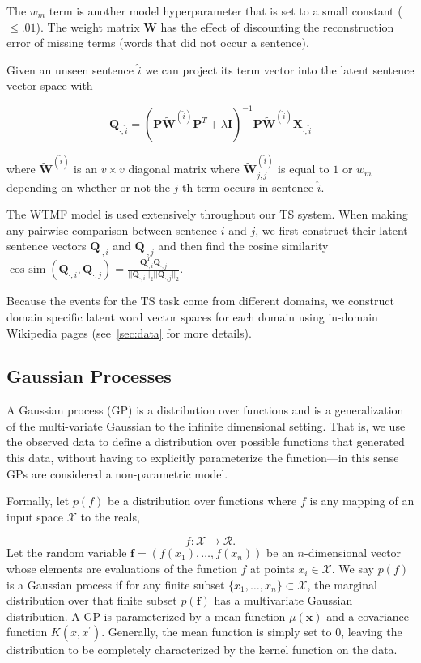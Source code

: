 The $w_m$ term is another model hyperparameter that is set to a small constant
($\le .01$). The weight matrix $\mathbf{W}$ has the effect of discounting the
reconstruction error of missing terms (words that did not occur a sentence).

Given an unseen sentence $\hat{i}$ we can project its term vector into the
latent sentence vector space with 

$$
\mathbf{Q}_{\cdot,\hat{i}} = (\mathbf{P}\mathbf{\tilde{W}}^{(\hat{i})}
\mathbf{P}^T  + \lambda\mathbf{I} )^{-1} 
\mathbf{P}\mathbf{\tilde{W}}^{(\hat{i})} \mathbf{X}_{\cdot, \hat{i}}
$$  

where $\mathbf{\tilde{W}}^{(\hat{i})}$ is an $v\times v$ diagonal matrix
where $\mathbf{\tilde{W}}^{(\hat{i})}_{j,j}$ is equal to $1$ or $w_m$ 
depending on whether or not the $j$-th term occurs in sentence $\hat{i}$.


The WTMF model is used extensively throughout our TS system. When making any 
pairwise comparison between sentence $i$ and $j$, we first construct
their latent sentence vectors $\mathbf{Q}_{\cdot,i}$ and
$\mathbf{Q}_{\cdot,j}$ and then find the cosine similarity 
$\displaystyle \operatorname{cos-sim}
(\mathbf{Q}_{\cdot,i}, \mathbf{Q}_{\cdot,j}) = 
\frac{\mathbf{Q}_{\cdot,i}^T\mathbf{Q}_{\cdot,j}}{||\mathbf{Q}_{\cdot,i}||_2
||\mathbf{Q}_{\cdot,j}||_2   }$.


Because the events for the TS task come from different domains, we construct
domain specific latent word vector spaces for each domain using in-domain 
Wikipedia pages (see~\cref{sec:data} for more details).

\subsection{Gaussian Processes}

A Gaussian process (GP) is a distribution over functions and is a 
generalization of the multi-variate Gaussian to the infinite dimensional
setting. That is, we use the observed data to define a distribution over 
possible functions that generated this data, without having to explicitly 
parameterize the function---in this sense GPs are considered 
a non-parametric model.

Formally, let $p(f)$ be a distribution over functions where $f$ is any mapping
of an input space $\mathcal{X}$ to the reals,

$$f: \mathcal{X} \rightarrow \mathcal{R}.$$ 
Let the random variable $\mathbf{f} = (f(x_1),\ldots,f(x_n) )$ be
 an $n$-dimensional vector whose elements are evaluations of the function $f$
at points $x_i \in \mathcal{X}$.
We say $p(f)$ is a Gaussian process if for any finite subset 
$\{x_1,\ldots,x_n\} \subset \mathcal{X}$, the marginal distribution over 
that finite subset $p(\mathbf{f})$ has a multivariate Gaussian distribution.
A GP is parameterized by a mean function $\mu(\mathbf{x})$ and a 
covariance function $K(x,x^\prime)$. Generally, the mean function is simply
set to 0, leaving the distribution to be completely characterized by the
kernel function on the data.

